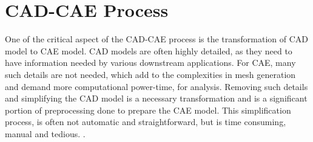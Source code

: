 \section{CAD-CAE Process} \label{sec:intro:cadcae}


One of the critical aspect of the CAD-CAE process is the transformation of CAD model to CAE model. CAD models are often highly detailed, as they need to have information needed by various downstream applications. For CAE, many such details are not needed, which add to the complexities in mesh generation and demand more computational power-time, for analysis. Removing such details and simplifying the CAD model is a necessary transformation and is a significant portion of preprocessing done to prepare the CAE model. This simplification process, is often not automatic and straightforward, but is time consuming, manual and tedious.
\cite{Halpern1997}. 
